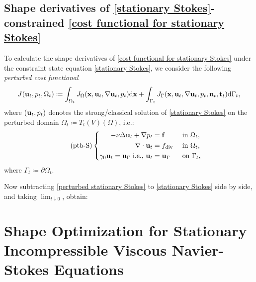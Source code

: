 \documentclass[oneside]{book}
\numberwithin{equation}{section}
\begin{document}
\section{Shape derivatives of \eqref{stationary Stokes}-constrained \eqref{cost functional for stationary Stokes}}
To calculate the shape derivatives of \eqref{cost functional for stationary Stokes} under the constraint state equation \eqref{stationary Stokes}, we consider the following \textit{perturbed cost functional}
\begin{align}
    \label{perturbed cost functional for stationary Stokes}
    J({\bf u}_t,p_t,\Omega_t)\coloneqq\int_{\Omega_t} J_\Omega({\bf x},{\bf u}_t,\nabla{\bf u}_t,p_t){\rm d}{\bf x} + \int_{\Gamma_t} J_\Gamma({\bf x},{\bf u}_t,\nabla{\bf u}_t,p_t,{\bf n}_t,{\bf t}_t){\rm d}\Gamma_t,
\end{align}
where $({\bf u}_t,p_t)$ denotes the strong/classical solution of \eqref{stationary Stokes} on the perturbed domain $\Omega_t\coloneqq T_t(V)(\Omega)$, i.e.:
\begin{equation}
    \label{perturbed stationary Stokes}
    \tag{ptb-S}
    \left\{\begin{split}
        -\nu\Delta{\bf u}_t + \nabla p_t &= {\bf f} &&\mbox{ in } \Omega_t,\\
        \nabla\cdot{\bf u}_t &= f_{\rm div} &&\mbox{ in } \Omega_t,\\
        \gamma_0{\bf u}_t = {\bf u}_\Gamma \mbox{ i.e., } {\bf u}_t &= {\bf u}_\Gamma &&\mbox{ on } \Gamma_t,
    \end{split}\right.
\end{equation}
where $\Gamma_t\coloneqq\partial\Omega_t$.

Now subtracting \eqref{perturbed stationary Stokes} to \eqref{stationary Stokes} side by side, and taking $\lim_{t\downarrow 0}$, obtain:


\chapter{Shape Optimization for Stationary Incompressible Viscous Navier-Stokes Equations}
\end{document}
